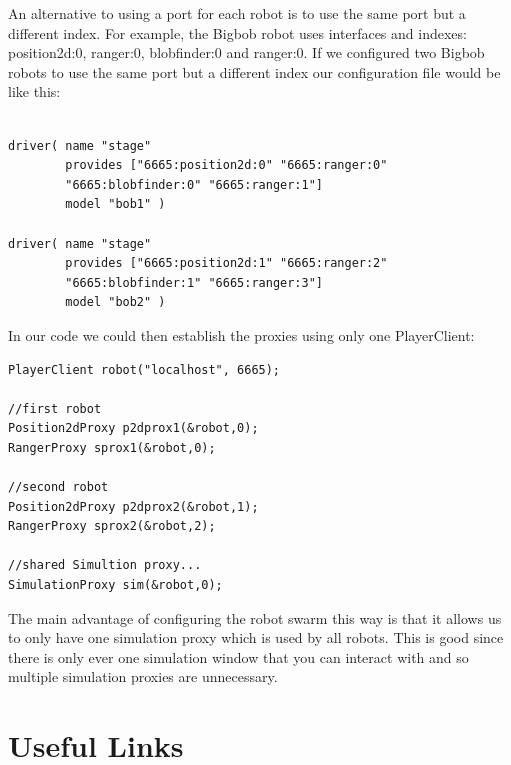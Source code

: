 \documentclass[a4paper]{report}
\begin{document}
An alternative to using a port for each robot is to use the same port but a
different index. 
For example, the Bigbob robot uses interfaces and indexes: position2d:0,
ranger:0, blobfinder:0 and ranger:0. If we configured two Bigbob robots to
use the same port but a different index our configuration file would be
like this: \begin{verbatim}

driver( name "stage" 
        provides ["6665:position2d:0" "6665:ranger:0" 
        "6665:blobfinder:0" "6665:ranger:1"] 
        model "bob1" )

driver( name "stage" 
        provides ["6665:position2d:1" "6665:ranger:2" 
        "6665:blobfinder:1" "6665:ranger:3"] 
        model "bob2" )
\end{verbatim}
In our code we could then establish the proxies using only one PlayerClient:
\begin{verbatim}
PlayerClient robot("localhost", 6665);

//first robot
Position2dProxy p2dprox1(&robot,0);
RangerProxy sprox1(&robot,0);

//second robot
Position2dProxy p2dprox2(&robot,1);
RangerProxy sprox2(&robot,2);

//shared Simultion proxy...
SimulationProxy sim(&robot,0);
\end{verbatim}
The main advantage of configuring the robot swarm this way is that it
allows us to only have one simulation proxy which is used by all robots.
This is good since there is only ever one simulation window that you can
interact with and so multiple simulation proxies are unnecessary.

\chapter{Useful Links}
\end{document}
